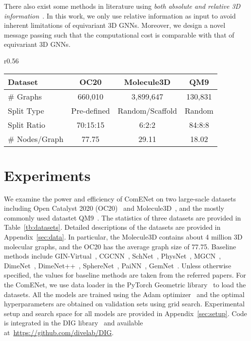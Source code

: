 \documentclass{article}
\begin{document}
There also exist some methods in literature using \textit{both absolute and relative 3D information}~\cite{godwin2021very,hu2021forcenet,ying2021do}. 
In this work, we only use relative information as input to avoid inherent limitations of equivariant 3D GNNs.
Moreover, we design a novel message passing such that the computational cost
is comparable with that of equivariant 3D GNNs.

\begin{wraptable}[7]{r}{0.56\textwidth}\vspace{-10 pt}
\begin{center}
\vspace{-10pt}
\caption{Statistics of the datasets.}
\vspace{-5pt}
\label{tb:datasets}
\resizebox{0.56\textwidth}{!}
{\begin{tabular}{l|ccc}\toprule
Dataset &OC20 &Molecule3D &QM9 \\
\midrule
\# Graphs &660,010 &3,899,647 &130,831 \\
Split Type &Pre-defined &Random/Scaffold &Random \\
Split Ratio &70:15:15 &6:2:2 &84:8:8 \\
\# Nodes/Graph &77.75 &29.11 &18.02 \\
\bottomrule
\end{tabular}}
\end{center}
\vspace{-10pt}
\end{wraptable}



\section{Experiments}  \label{sec:exp}

We examine the power and efficiency
of ComENet on two large-sacle datasets including 
Open Catalyst 2020 (OC20)~\cite{chanussot2021open} and
Molecule3D~\cite{xu2021molecule3d}, 
and the mostly commonly used datastet QM9~\cite{ramakrishnan2014quantum}.
The statistics of three datasets are provided in Table~\ref{tb:datasets}. Detailed descriptions of the datasets are provided in Appendix~\ref{sec:data}. 
In particular, the Molecule3D contains about 4 million 3D molecular graphs,
and the OC20 has the average graph size of 77.75.
Baseline methods include GIN-Virtual~\cite{hu2021ogb}, 
CGCNN~\cite{xie2018crystal}, 
SchNet~\cite{schutt2017schnet}, 
PhysNet~\cite{unke2019physnet}, 
MGCN~\cite{lu2019molecular}, 
DimeNet~\cite{klicpera_dimenet_2020}, 
DimeNet++~\cite{klicpera_dimenetpp_2020}, 
SphereNet~\cite{liu2022spherical}, 
PaiNN~\cite{schutt2021equivariant}, 
GemNet~\cite{klicpera2021gemnet}.
Unless otherwise specified, the values for baseline methods are taken from the referred papers.
For the ComENet, we use data loader in the PyTorch Geometric library~\cite{Fey/Lenssen/2019} to load the datasets.
All the models are trained using the Adam optimizer~\cite{kingma2014adam} and the optimal hyperparameters
are obtained on validation sets using grid search. 
Experimental setup and search space for all
models are provided in Appendix~\ref{sec:setup}. 
Code is integrated in the DIG library~\cite{liu2021dig} and available at~\url{https://github.com/divelab/DIG}.
\end{document}
